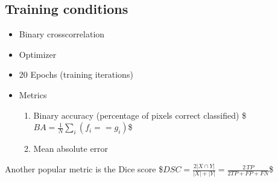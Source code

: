 \documentclass[letterpaper,10pt,english]{sphinxmanual}
\begin{document}
\begin{sphinxVerbatim}[commandchars=\\\{\}]
  
\end{sphinxVerbatim}

\noindent{}


\subsection{Training conditions}
\label{\detokenize{ML4NeutronImageSegmentation:training-conditions}}\begin{itemize}
\item {} 
 \sphinxhyphen{} Binary cross\sphinxhyphen{}correlation

\item {} 
Optimizer \sphinxhyphen{} 

\item {} 
20 Epochs (training iterations)

\item {} 
Metrics
\begin{enumerate}
%
\item {} 
Binary accuracy (percentage of pixels correct classified)
\$\(BA=\frac{1}{N}\sum_i(f_i==g_i)\)\$

\item {} 
Mean absolute error

\end{enumerate}

\end{itemize}

Another popular metric is the Dice score
\$\(DSC=\frac{2|X \cap Y|}{|X|+|Y|}=\frac{2\,TP}{2TP+FP+FN}\)\$
\end{document}
